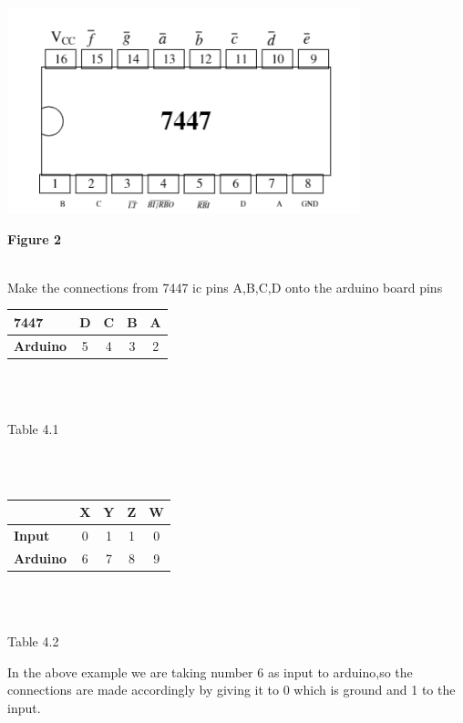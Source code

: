 \documentclass[journal,12pt,twocolumn]{IEEEtran}
\begin{document}
\includegraphics{ic fig.png}
\begin{center}

\textbf{Figure 2} \\
\
\end{center}
\raggedright{Make the connections from 7447 ic pins A,B,C,D onto the arduino board pins}\\
\centering
\begin{tabular}{|l|c|c|c|c|}
\hline
\textbf{7447} & D & C & B & A\\
\hline
\textbf{Arduino} & 5 & 4 & 3 & 2\\
\hline
\end{tabular}\\
\
\centerline{Table 4.1}\\
\
\centering
\\\begin{tabular}{|l|c|c|c|c|}
\hline
& X & Y & Z & W\\
\hline
\textbf{Input} & 0 & 1 & 1 & 0\\
\hline
\textbf{Arduino} & 6 & 7 & 8 & 9\\
\hline
\end{tabular}\\
\
\centerline{Table 4.2}
\raggedright
In the above example we are taking number 6 as input to arduino,so the connections are made accordingly by giving it to 0 which is ground and 1 to the input.
\end{document}
